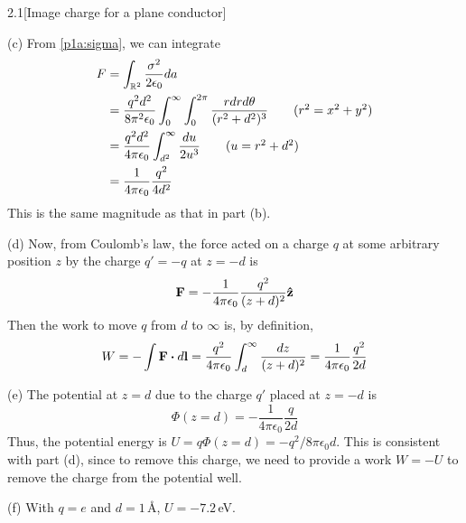 \documentclass[12pt]{article}
\begin{document}
\begin{problem}{2.1}[Image charge for a plane conductor]
\begin{solution}
(c) From \eqref{p1a:sigma}, we can integrate
\begin{align}
    F&=\int_{\mathbb{R}^2}\frac{\sigma^2}{2\epsilon_0}da\notag\\
     &=\frac{q^2d^2}{8\pi^2\epsilon_0}\int_0^\infty\int_0^{2\pi}
     \frac{rdrd\theta}{(r^2+d^2)^3}\tag{$r^2=x^2+y^2$}\\
     &=\frac{q^2d^2}{4\pi\epsilon_0}\int_{d^2}^\infty\frac{du}{2u^3}
        \tag{$u=r^2+d^2$}\\
     &=\frac1{4\pi\epsilon_0}\frac{q^2}{4d^2}
\end{align}
This is the same magnitude as that in part (b).

(d) Now, from Coulomb's law, the force acted on a charge $q$ at some arbitrary 
position $z$ by the charge $q'=-q$ at $z=-d$ is
\begin{equation}
    \vb{F}=-\frac{1}{4\pi\epsilon_0}\frac{q^2}{(z+d)^2}\vb{\hat{z}} 
\end{equation}
Then the work to move $q$ from $d$ to $\infty$ is, by definition,
\begin{align}
    W=-\int\vb{F}\vdot d\vb{l}
    =\frac{q^2}{4\pi\epsilon_0}\int_{d}^\infty\frac{dz}{(z+d)^2}
    =\frac{1}{4\pi\epsilon_0}\frac{q^2}{2d}
\end{align}
\end{solution}

(e) The potential at $z=d$ due to the charge $q'$ placed at $z=-d$ is
\begin{equation}
    \Phi(z=d)=-\frac{1}{4\pi\epsilon_0}\frac{q}{2d}
\end{equation}
Thus, the potential energy is $U=q\Phi(z=d)=-q^2/8\pi\epsilon_0d$. This is
consistent with part (d), since to remove this charge, we need to provide a work
$W=-U$ to remove the charge from the potential well.

(f) With $q=e$ and $d=1$\,\si{\angstrom}, $U=-7.2$\,\si{eV}.

\end{problem}

\end{document}
